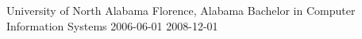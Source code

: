 \educationitem
    {University of North Alabama}
    {Florence, Alabama}
    {Bachelor in Computer Information Systems}
    {2006-06-01}
    {2008-12-01}
